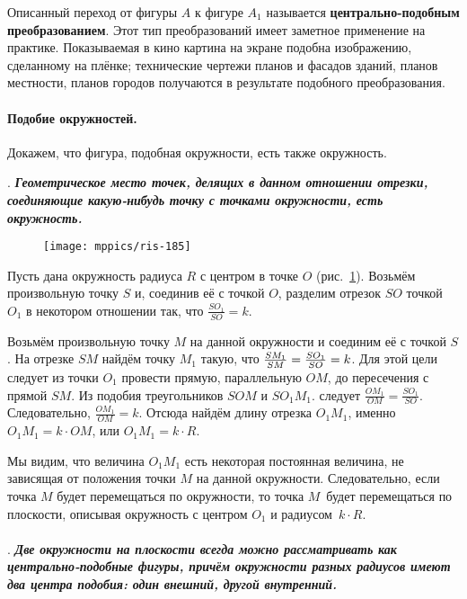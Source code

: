{\sloppy 
Описанный переход от фигуры $A$ к фигуре $A_1$ называется \textbf{центрально-подобным преобразованием}. 
Этот тип преобразований имеет заметное применение на практике.
Показываемая в кино картина на экране подобна изображению, сделанному на плёнке;
технические чертежи планов и фасадов зданий, планов местности, планов городов
получаются в результате подобного преобразования.

}

{\sloppy

\paragraph{Подобие окружностей.}\label{1938/178}
Докажем, что фигура, подобная окружности, есть также окружность.

}

\smallskip

.
\textbf{\emph{Геометрическое место точек, делящих в данном отношении отрезки, соединяющие какую-нибудь точку с точками окружности, есть окружность.}}


\begin{figure}[h]
\centering
\texttt{[image: mppics/ris-185]}
\caption{}\label{1938/ris-185}
\end{figure}

Пусть дана окружность радиуса $R$ с центром в точке $O$ (рис.~\ref{1938/ris-185}).
Возьмём произвольную точку $S$ и, соединив её с точкой $O$, разделим отрезок $SO$ точкой $O_1$ в некотором отношении так, что $\frac{SO_1}{SO}= k$.

Возьмём произвольную точку $M$ на данной окружности и соединим её с точкой $S$.
На отрезке $SM$ найдём точку $M_1$ такую, что $\frac{SM_1}{SM}\z=\frac{SO_1}{SO}= k$.
Для этой цели следует из точки $O_1$ провести прямую, параллельную $OM$, до пересечения с прямой $SM$.
Из подобия треугольников $SOM$ и $SO_1M_1$.
следует $\frac{OM_1}{OM}=\frac{SO_1}{SO}$.
Следовательно, $\frac{OM_1}{OM}=k$.
Отсюда найдём длину отрезка $O_1M_1$, именно $O_1M_1=k\cdot OM$, или $O_1M_1=k\cdot R$.

Мы видим, что величина $O_1M_1$ есть некоторая постоянная величина, не зависящая от положения точки $M$ на данной окружности.
Следовательно, если точка $M$ будет перемещаться по окружности, то точка $M$\ будет перемещаться по плоскости, описывая окружность с центром $O_1$ и радиусом~$k\cdot R$.

\paragraph{}\label{1938/179}
.
\textbf{\emph{Две окружности на плоскости всегда можно рассматривать как центрально-подобные фигуры, причём окружности разных радиусов имеют два центра подобия:
один внешний, другой внутренний.}} 

